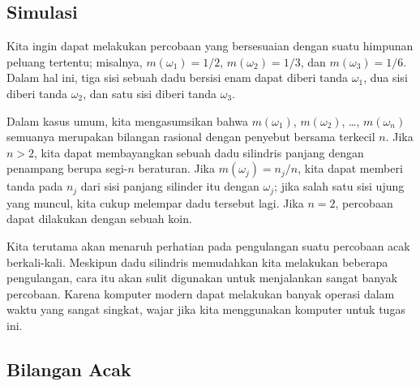 \subsection*{Simulasi}

Kita ingin dapat melakukan percobaan yang bersesuaian dengan suatu himpunan
peluang tertentu; misalnya, $m(\omega_1) = 1/2$, $m(\omega_2) = 1/3$, dan
$m(\omega_3) = 1/6$.  Dalam hal ini, tiga sisi sebuah dadu bersisi enam dapat diberi tanda $\omega_1$,
dua sisi diberi tanda $\omega_2$, dan satu sisi diberi tanda $\omega_3$.  
\par
Dalam kasus umum, kita mengasumsikan bahwa $m(\omega_1)$, $m(\omega_2)$, \dots, $m(\omega_n)$ semuanya merupakan bilangan
rasional dengan penyebut bersama terkecil $n$.  Jika $n > 2$, kita dapat membayangkan sebuah dadu silindris panjang dengan
penampang berupa segi-$n$ beraturan.  Jika $m(\omega_j) = n_j/n$, kita dapat memberi tanda pada $n_j$ dari
sisi panjang silinder itu dengan $\omega_j$; jika salah satu sisi ujung yang muncul, kita cukup
melempar dadu tersebut lagi.  Jika $n = 2$, percobaan dapat dilakukan dengan sebuah koin.
\par
Kita terutama akan menaruh perhatian pada pengulangan suatu percobaan acak
berkali-kali.  Meskipun dadu silindris memudahkan kita melakukan
beberapa pengulangan, cara itu akan sulit digunakan untuk menjalankan sangat banyak
percobaan.  Karena komputer modern dapat melakukan banyak operasi
dalam waktu yang sangat singkat, wajar jika kita menggunakan komputer untuk tugas ini.

\subsection*{Bilangan Acak}

